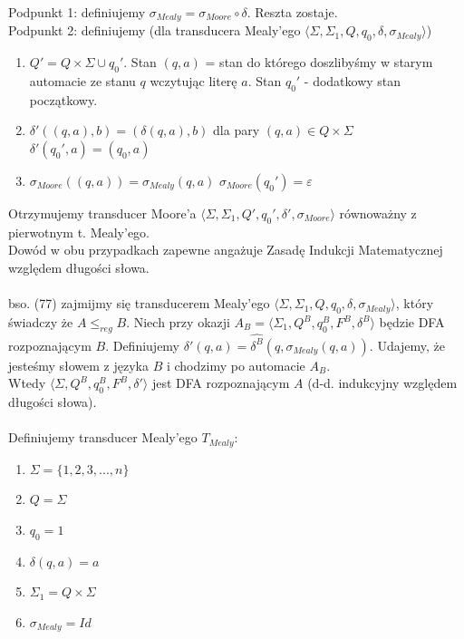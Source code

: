 \documentclass[a4paper,11pt]{article}
\newenvironment{zadanie}[1]
  {\renewcommand\theinnercustomthm{#1}\innercustomthm}
  {\endinnercustomthm}
\begin{document}
\begin{zadanie}{77}
\end{zadanie}
Podpunkt 1: definiujemy $\sigma_{Mealy} = \sigma_{Moore} \circ \delta$. Reszta zostaje.\\
Podpunkt 2: definiujemy (dla transducera Mealy'ego $\langle \Sigma, \Sigma_1, Q, q_0, \delta, \sigma_{Mealy} \rangle$)
\begin{enumerate}
 \item $Q' = Q \times \Sigma \cup q_0'$. Stan $(q,a)$ = stan do którego doszlibyśmy w starym automacie ze stanu $q$ wczytując
 literę $a$. Stan $q_0'$ - dodatkowy stan początkowy.
 \item 
 \subitem $\delta'((q,a),b) = (\delta(q,a),b)$ dla pary $(q,a) \in Q \times \Sigma$
 \subitem $\delta'(q_0',a) = (q_0,a)$
 \item
 \subitem $\sigma_{Moore}((q,a)) = \sigma_{Mealy}(q,a)$
 \subitem $\sigma_{Moore}(q_0') = \varepsilon$
\end{enumerate}
Otrzymujemy transducer Moore'a $\langle \Sigma, \Sigma_1, Q', q_0', \delta', \sigma_{Moore} \rangle$ równoważny z pierwotnym
t. Mealy'ego. \\
Dowód w obu przypadkach zapewne angażuje Zasadę Indukcji Matematycznej względem długości słowa. \\ \\ 

\begin{zadanie}{78}
\end{zadanie}
bso. (77) zajmijmy się transducerem Mealy'ego $\langle \Sigma, \Sigma_1, Q, q_0, \delta, \sigma_{Mealy} \rangle$, który 
świadczy że $A \leqslant_{reg}B$. Niech przy okazji $A_B = \langle \Sigma_1, Q^B, q_0^B, F^B, \delta^B\rangle$ będzie DFA
rozpoznającym $B$. Definiujemy $\delta'(q,a) = \widehat{\delta^B}(q,\sigma_{Mealy}(q,a))$. Udajemy, że jesteśmy słowem z języka
$B$ i chodzimy po automacie $A_B$.\\
Wtedy $\langle \Sigma, Q^B, q_0^B, F^B, \delta' \rangle$ jest DFA rozpoznającym $A$ (d-d. indukcyjny względem długości słowa). \\ \\

\begin{zadanie}{79}
\end{zadanie}
Definiujemy transducer Mealy'ego $T_{Mealy}$:
\begin{enumerate}
 \item $\Sigma = \{1,2,3,...,n\}$
 \item $Q = \Sigma$
 \item $q_0 = 1$
 \item $\delta(q,a) = a$
 \item $\Sigma_1 = Q \times \Sigma$
 \item $\sigma_{Mealy} = Id$
\end{enumerate}
\end{document}
